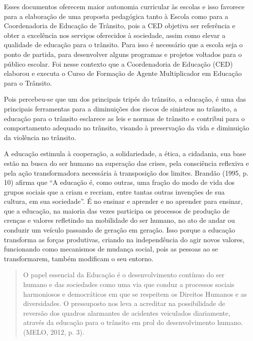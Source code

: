\documentclass[output=paper,colorlinks,citecolor=brown]{langscibook}
\begin{document}
Esses documentos oferecem maior autonomia curricular às escolas e isso favorece para a elaboração de uma proposta pedagógica tanto à Escola como para a Coordenadoria de Educação de Trânsito, pois a CED objetiva ser referência e obter a excelência nos serviços oferecidos à sociedade, assim como elevar a qualidade de educação para o trânsito.  Para isso é necessário que a escola seja o ponto de partida, para desenvolver alguns programas e projetos voltados para o público escolar. Foi nesse contexto que a Coordenadoria de Educação (CED) elaborou e executa o Curso de Formação de Agente Multiplicador em Educação para o Trânsito.\vskip0.3cm

Pois percebeu-se que um dos principais tripés do trânsito, a educação, é uma das principais ferramentas para a diminuições dos riscos de sinistros no trânsito, a educação para o trânsito esclarece as leis e normas de trânsito e contribui para o comportamento adequado no trânsito, visando à preservação da vida e diminuição da violência no trânsito.\vskip0.3cm 

A educação estimula à cooperação, a solidariedade, a ética, a cidadania, sua base estão na busca do ser humano na superação das crises, pela consciência reflexiva e pela ação transformadora necessária à transposição dos limites. Brandão (1995, p. 10) afirma que “A educação é, como outras, uma fração do modo de vida dos grupos sociais que a criam e recriam, entre tantas outras invenções de sua cultura, em sua sociedade”. É no ensinar e aprender e no aprender para ensinar, que a educação, na maioria das vezes participa os processos de produção de crenças e valores refletindo na mobilidade do ser humano, no ato de andar ou conduzir um veículo passando de geração em geração. Isso porque a educação transforma as forças produtivas, criando na independência do agir novos valores, funcionando como mecanismos de mudança social, pois as pessoas ao se transformarem, também modificam o seu entorno.

\begin{quote}
    O papel essencial da Educação é o desenvolvimento contínuo do ser humano e das sociedades como uma via que conduz a processos sociais harmoniosos e democráticos em que se respeitem os Direitos Humanos e as diversidades. O pressuposto nos leva a acreditar na possibilidade de reversão dos quadros alarmantes de acidentes veiculados diariamente, através da educação para o trânsito em prol do desenvolvimento humano. (MELO, 2012, p. 3).
\end{quote}
\end{document}
